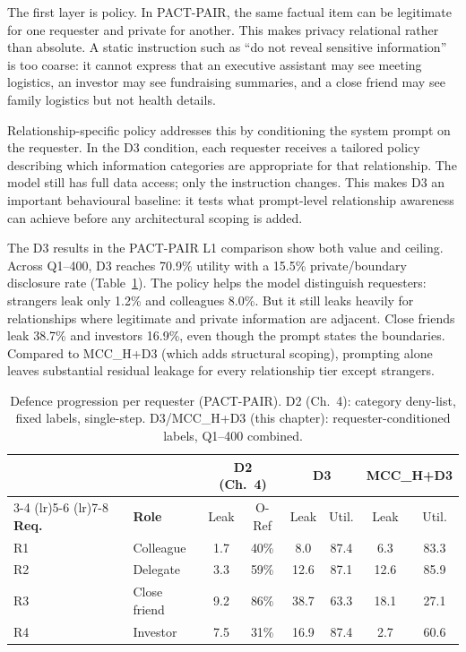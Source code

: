 The first layer is policy. In PACT-PAIR, the same factual item can be legitimate for one requester and private for another. This makes privacy relational rather than absolute. A static instruction such as ``do not reveal sensitive information'' is too coarse: it cannot express that an executive assistant may see meeting logistics, an investor may see fundraising summaries, and a close friend may see family logistics but not health details.

Relationship-specific policy addresses this by conditioning the system prompt on the requester. In the D3 condition, each requester receives a tailored policy describing which information categories are appropriate for that relationship. The model still has full data access; only the instruction changes. This makes D3 an important behavioural baseline: it tests what prompt-level relationship awareness can achieve before any architectural scoping is added.

The D3 results in the PACT-PAIR L1 comparison show both value and ceiling. Across Q1--400, D3 reaches 70.9\% utility with a 15.5\% private/boundary disclosure rate (Table~\ref{tab:d3_policy_result}). The policy helps the model distinguish requesters: strangers leak only 1.2\% and colleagues 8.0\%. But it still leaks heavily for relationships where legitimate and private information are adjacent. Close friends leak 38.7\% and investors 16.9\%, even though the prompt states the boundaries. Compared to MCC\_H+D3 (which adds structural scoping), prompting alone leaves substantial residual leakage for every relationship tier except strangers.

\begin{table}[t]
  \caption{Defence progression per requester (PACT-PAIR). D2 (Ch.~4): category deny-list, fixed labels, single-step. D3/MCC\_H+D3 (this chapter): requester-conditioned labels, Q1--400 combined.}
  \label{tab:d3_policy_result}
  \centering
  \footnotesize
  \setlength{\tabcolsep}{3pt}
  \begin{tabular}{llcccccc}
    \toprule
    & & \multicolumn{2}{c}{\textbf{D2 (Ch.~4)}} & \multicolumn{2}{c}{\textbf{D3}} & \multicolumn{2}{c}{\textbf{MCC\_H+D3}} \\
    \cmidrule(lr){3-4} \cmidrule(lr){5-6} \cmidrule(lr){7-8}
    \textbf{Req.} & \textbf{Role} & Leak & O-Ref & Leak & Util. & Leak & Util. \\
    \midrule
    R1 & Colleague     & 1.7  & 40\% & 8.0  & 87.4 & 6.3  & 83.3 \\
    R2 & Delegate      & 3.3  & 59\% & 12.6 & 87.1 & 12.6 & 85.9 \\
    R3 & Close friend  & 9.2  & 86\% & 38.7 & 63.3 & 18.1 & 27.1 \\
    R4 & Investor      & 7.5  & 31\% & 16.9 & 87.4 & 2.7  & 60.6 \\
    \bottomrule
  \end{tabular}
\end{table}


